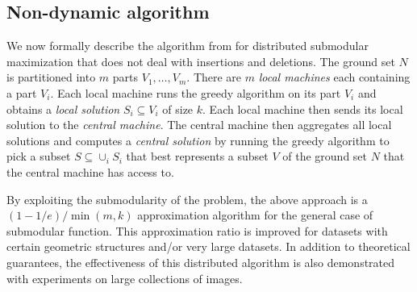 \subsection{Non-dynamic algorithm}

We now formally describe the algorithm from \citet{mirzasoleiman2013distributed} for distributed submodular maximization that does not deal with insertions and deletions. The ground set $N$ is partitioned into $m$ parts $V_1, \ldots, V_m$. There are $m$ \emph{local machines} each containing a part $V_i$. Each local machine runs the greedy algorithm on its part $V_i$ and obtains a \emph{local solution} $S_i \subseteq V_i$ of size $k$. Each local machine then sends its local solution to the \emph{central machine}. The central machine then aggregates all local solutions and computes a \emph{central solution} by running the greedy algorithm to pick a subset $S \subseteq \cup_i S_i$ that best represents a subset $V$ of the ground set $N$ that the central machine has access to.

By exploiting the submodularity of the problem, the above approach is a $(1-1/e)/ \min(m,k)$ approximation algorithm for the general case of submodular function. This approximation ratio is improved for datasets with certain geometric structures and/or very large datasets. In addition to theoretical guarantees, the effectiveness of this distributed algorithm is also demonstrated with experiments on large collections of images.